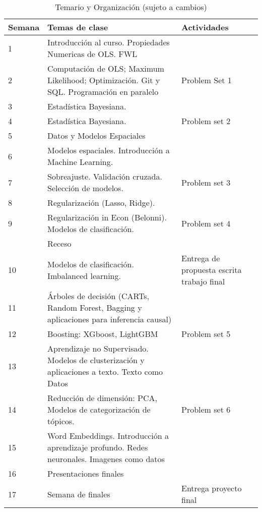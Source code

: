 \documentclass[11pt]{article}
\begin{document}
\begin{table}[H]
\centering
\caption{Temario y Organización (sujeto a cambios)}
\scriptsize
\begin{tabular}{|p{1cm}|p{8cm}|p{4cm}|}
\hline
Semana & Temas de clase     & Actividades    \\ \hline                                                                                                                                                                                                                                
1      & Introducción al curso. Propiedades Numericas de OLS. FWL   & \\ \hline
2      & Computación de OLS; Maximum Likelihood; Optimización. Git y SQL. Programación en paralelo  & Problem Set 1\\ \hline
3      & Estadística Bayesiana.          & \\ \hline
4      & Estadística Bayesiana.           & Problem set 2           \\ \hline
5      & Datos y Modelos Espaciales                                  & \\ \hline
6      & Modelos espaciales. Introducción a Machine Learning.     & \\ \hline
7      & Sobreajuste. Validación cruzada. Selección de modelos.   & Problem set 3 \\ \hline
8      & Regularización (Lasso, Ridge).    &                                                              \\ \hline
9      & Regularización in Econ (Belonni). Modelos de clasificación.   & Problem set 4    \\ \hline
       & Receso    &  \\ \hline
10     & Modelos de clasificación. Imbalanced learning.   & Entrega de propuesta escrita trabajo final        \\ \hline
11     & Árboles de decisión (CARTs, Random Forest, Bagging y aplicaciones para inferencia causal) & \\ \hline
12     & Boosting: XGboost, LightGBM  & Problem set  5                  \\ \hline
13     & Aprendizaje no Supervisado. Modelos de clusterización y aplicaciones a texto. Texto como Datos   &  \\ \hline
14     & Reducción de dimensión: PCA, Modelos de categorización de tópicos.  & Problem set 6  \\ \hline
15     & Word Embeddings. Introducción a aprendizaje profundo. Redes neuronales. Imagenes como datos  &   \\ \hline
16     & Presentaciones finales  &   \\ \hline
17     & Semana de finales  &  Entrega proyecto final  \\ 
\hline
\end{tabular}
\end{table}
\end{document}
